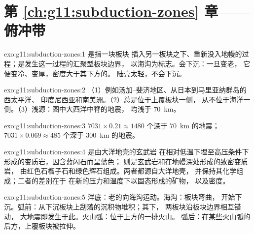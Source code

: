 \section*{第 \ref{ch:g11:subduction-zones} 章——俯冲带}

\begin{solution}{exo:g11:subduction-zones:1}
是指一块板块
插入另一板块之下、重新没入地幔的过程；是发生这一过程的汇聚型板块边界，
以海沟为标志。会下沉：一旦变老，
它便变冷、变厚，密度大于其下方的。
陆壳太轻，不会下沉。
\end{solution}

\begin{solution}{exo:g11:subduction-zones:2}
（1）例如汤加–斐济地区、从日本到马里亚纳群岛的西太平洋、
印度尼西亚和南美洲。（2）总是位于上覆板块一侧，
从不位于海洋一侧。（3）浅源：图中大西洋中脊的地震，
均浅于 \qty{70}{km}。
\end{solution}

\begin{solution}{exo:g11:subduction-zones:3}
$7031 \times 0.21 \approx 1480$ 个深于 \qty{70}{km} 的地震；
$7031 \times 0.069 \approx 485$ 个深于 \qty{300}{km} 的地震。
\end{solution}

\begin{solution}{exo:g11:subduction-zones:4}
是由大洋地壳的玄武岩
在相对低温下埋至高压条件下形成的变质岩，因含蓝闪石而呈蓝色；
则是玄武岩和在地幔深处形成的致密变质岩，
由红色石榴子石和绿色辉石组成。两者都源自大洋地壳，
并保持其化学组成；二者的差别在于
在新的压力和温度下以固态形成的矿物，
以及密度。
\end{solution}

\begin{solution}{exo:g11:subduction-zones:5}
洋底：老的向海沟运动。海沟：板块弯曲，
开始下沉。弧前：从下沉板块上刮落的沉积物堆积；其下，
两板块沿板块边界相互错动，
大地震即发生于此。火山弧：位于上方的一排火山。
弧后：在某些火山弧的后方，上覆板块被拉伸。
\end{solution}

